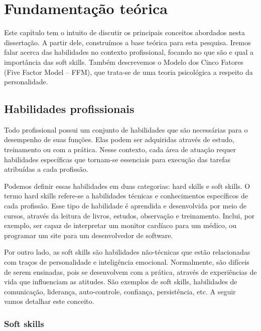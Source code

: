 

\chapter{Fundamentação teórica}

\label{chap:theorical}

Este capítulo tem o intuito de discutir os principais conceitos abordados nesta dissertação. A partir dele, construímos a base teórica para esta pesquisa. Iremos falar acerca das habilidades no contexto profissional, focando no que são e qual a importância das soft skills. Também descrevemos o Modelo dos Cinco Fatores (Five Factor Model – FFM), que trata-se de uma teoria psicológica a respeito da personalidade.

\section{Habilidades profissionais}
\label{sec:sskills}

Todo profissional possui um conjunto de habilidades que são necessárias para o desempenho de suas funções. Elas podem ser adquiridas através de estudo, treinamento ou com a prática. Nesse contexto, cada área de atuação requer habilidades específicas que tornam-se essenciais para execução das tarefas atribuídas a cada profissão.

Podemos definir essas habilidades em duas categorias: hard skills e soft skills. O termo hard skills refere-se a habilidades técnicas e conhecimentos específicos de cada profissão. Esse tipo de habilidade é aprendida e desenvolvida por meio de cursos, através da leitura de livros, estudos, observação e treinamento. Inclui, por exemplo, ser capaz de interpretar um monitor cardíaco para um médico, ou programar um site para um desenvolvedor de software.

Por outro lado, as soft skills são habilidades não-técnicas que estão relacionadas com traços de personalidade e inteligência emocional. Normalmente, são difíceis de serem ensinadas, pois se desenvolvem com a prática, através de experiências de vida que influenciam as atitudes. São exemplos de soft skills, habilidades de comunicação, liderança, auto-controle, confiança, persistência, etc. A seguir vamos detalhar este conceito.

\subsection{Soft skills}
\label{subsec:ss}

